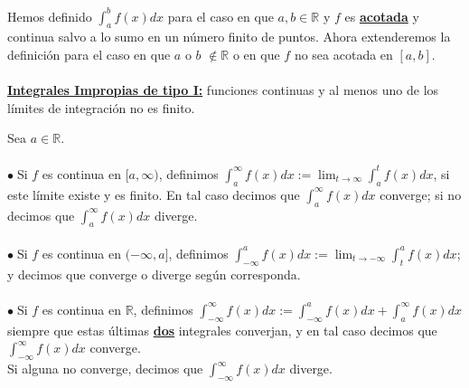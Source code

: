 \documentclass{article}
\theoremstyle{definition}
\theoremstyle{remark}
\newcommand\R{\ensuremath{\mathbb{R}}}
\newcommand\bl{$\bullet\;$}
\newcommand\infi{\infty}
\begin{document}
Hemos definido $\int_{a}^{b}{f(x)dx}$ para el caso en que \underline{\textbf{$a,b \in \R $}} y $f$ es \underline{\textbf{acotada}} y continua salvo a lo sumo en un número finito de puntos. Ahora extenderemos la definición para el caso en que $a$ o $b$ $\notin \R $ o en que $f$ no sea acotada en $[a,b]$.\\\\
\textbf{\underline{Integrales Impropias de tipo I:}} funciones continuas y al menos uno de los límites de integración no es finito.\\ 
\pagebreak
\begin{defi}
  Sea $a \in \R $.\\\\
  \bl Si $f$ es continua en $[a, \infi )$, definimos $\int_{a}^{\infi
  }{f(x)dx}:=\lim_{t\to \infi} {\int_{a}^{t}{f(x)}dx}$, si este límite existe y es finito. En tal caso decimos que $\int_{a}^{\infi}{f(x)dx}$ converge; si no decimos que $\int_{a}^{\infi}{f(x)dx}$ diverge.\\\\
  \bl Si $f$ es continua en $(-\infi,a]$, definimos $\int_{-\infi}^{a}{f(x)dx}:=\lim_{t\to-\infi}{\int_{t}^{a}{f(x)dx}}$; y decimos que converge o diverge según corresponda. \\\\
  \bl Si $f$ es continua en $\R$, definimos $\int_{-\infi}^{\infi}{f(x)dx}:=\int_{-\infi}^{a}{f(x)dx}+\int_{a}^{\infi}{f(x)dx}$ siempre que estas últimas \underline{\textbf{dos}} integrales converjan, y en tal caso decimos que $\int_{-\infi}^{\infi}{f(x)dx}$ converge. \\ Si alguna no converge, decimos que $\int_{-\infi}^{\infi}{f(x)dx}$ diverge.
\end{defi}
\end{document}
